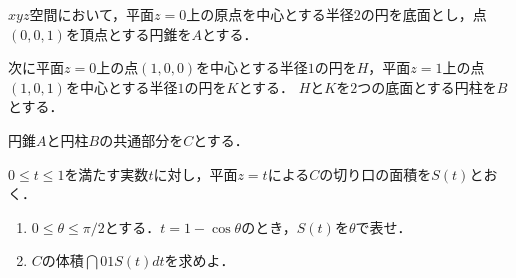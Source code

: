 \documentclass[a4j]{jarticle}
\begin{document}

     \begin{oframed}
     $xyz$空間において，平面$z=0$上の原点を中心とする半径$2$の円を底面とし，点$(0,0,1)$を頂点とする円錐を$A$とする．
     
     次に平面$z=0$上の点$(1,0,0)$を中心とする半径$1$の円を$H$，平面$z=1$上の点$(1,0,1)$を中心とする半径$1$の円を$K$とする．
     $H$と$K$を$2$つの底面とする円柱を$B$とする．
     
     円錐$A$と円柱$B$の共通部分を$C$とする．
     
     $0\le t\le1$を満たす実数$t$に対し，平面$z=t$による$C$の切り口の面積を$S(t)$とおく．
          \begin{enumerate}[(1)]
          \item $0\le\theta\le\pi/2$とする．$t=1-\cos\theta$のとき，$S(t)$を$\theta$で表せ．
          \item $C$の体積$\dint{0}{1}S(t)dt$を求めよ．
          \end{enumerate}     
     \end{oframed}
\end{document}
